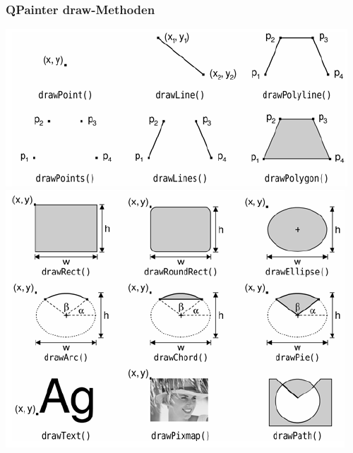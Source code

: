     \begin{minipage}{0.6\linewidth}
        \subsubsection{QPainter draw-Methoden}
        \includegraphics[width=\linewidth]{images/draw_1.png}\newline
        \includegraphics[width=\linewidth]{images/draw_2.png}
    \end{minipage}
    
